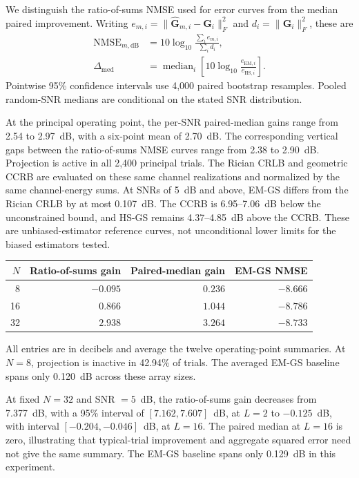 We distinguish the ratio-of-sums NMSE used for error curves from the median
paired improvement. Writing $e_{m,i}=\|\widehat{\mathbf G}_{m,i}
-\mathbf G_i\|_F^2$ and $d_i=\|\mathbf G_i\|_F^2$, these are
\begin{align}
\mathrm{NMSE}_{m,\mathrm{dB}}&=10\log_{10}
 \frac{\sum_i e_{m,i}}{\sum_i d_i},\\
\Delta_{\mathrm{med}}&=\operatorname{median}_i
 \left[10\log_{10}\frac{e_{\mathrm{EM},i}}{e_{\mathrm{HS},i}}\right].
\end{align}
Pointwise 95\% confidence intervals use 4,000 paired bootstrap resamples.
Pooled random-SNR medians are conditional on the stated SNR distribution.

At the principal operating point, the per-SNR paired-median gains range
from 2.54 to 2.97~dB, with a six-point mean of 2.70~dB. The corresponding
vertical gaps between the ratio-of-sums NMSE curves range from 2.38 to
2.90~dB. Projection is active in all 2,400 principal trials. The Rician
CRLB and geometric CCRB are evaluated on these same channel realizations
and normalized by the same channel-energy sums. At SNRs of 5~dB and
above, EM-GS differs from the Rician CRLB by at most 0.107~dB. The CCRB
is 6.95--7.06~dB below the unconstrained bound, and HS-GS remains
4.37--4.85~dB above the CCRB. These are unbiased-estimator reference
curves, not unconditional lower limits for the biased estimators tested.

\begin{center}
\begin{tabular}{rrrr}
\toprule
$N$ & Ratio-of-sums gain & Paired-median gain & EM-GS NMSE\\
\midrule
8 & $-0.095$ & $0.236$ & $-8.666$\\
16 & $0.866$ & $1.044$ & $-8.786$\\
32 & $2.938$ & $3.264$ & $-8.733$\\
\bottomrule
\end{tabular}
\end{center}
All entries are in decibels and average the twelve operating-point
summaries. At $N=8$, projection is inactive in 42.94\% of trials.
The averaged EM-GS baseline spans only 0.120~dB across these array sizes.

At fixed $N=32$ and SNR $=5$~dB, the ratio-of-sums gain decreases from
7.377~dB, with a 95\% interval of $[7.162,7.607]$~dB, at $L=2$ to
$-0.125$~dB, with interval $[-0.204,-0.046]$~dB, at $L=16$.
The paired median at $L=16$ is zero, illustrating that typical-trial
improvement and aggregate squared error need not give the same summary.
The EM-GS baseline spans only 0.129~dB in this experiment.

